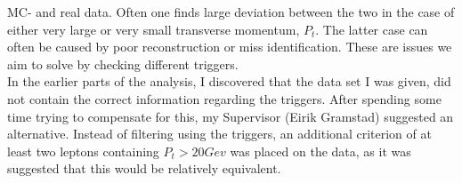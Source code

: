 \ac{MC}- and real data. Often one finds large deviation between the two in the case
of either very large or very small transverse momentum, $P_t$. The latter case can often be caused by 
poor reconstruction or miss identification. These are issues we aim to solve by checking
different triggers. 
\\
In the earlier parts of the analysis, I discovered that the data set I was given, did not contain the correct information 
regarding the triggers. After spending some time trying to compensate for this, my Supervisor (Eirik Gramstad) suggested an alternative.
Instead of filtering using the triggers, an additional criterion of at least two leptons containing $P_t>20Gev$ was placed on the data,
as it was suggested that this would be relatively equivalent.

